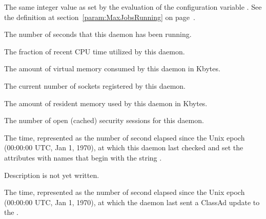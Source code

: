 \begin{description}
\item[\AdAttr{MaxJobsRunning}:] The same integer value as set by the
  evaluation of the configuration variable .
  See the definition at section~\ref{param:MaxJobsRunning} on
  page~\pageref{param:MaxJobsRunning}.

\item[\AdAttr{MonitorSelfAge}:] The number of seconds that this daemon
  has been running.

\item[\AdAttr{MonitorSelfCPUUsage}:] The fraction of recent CPU time utilized
  by this daemon. 

\item[\AdAttr{MonitorSelfImageSize}:] The amount of virtual memory consumed by
  this daemon in Kbytes.

\item[\AdAttr{MonitorSelfRegisteredSocketCount}:] The current number of sockets
  registered by this daemon.

\item[\AdAttr{MonitorSelfResidentSetSize}:] The amount of resident memory
  used by this daemon in Kbytes.

\item[\AdAttr{MonitorSelfSecuritySessions}:] The number of open (cached)
  security sessions for this daemon.

\item[\AdAttr{MonitorSelfTime}:] The  time, represented as the number of
  second elapsed since the Unix epoch (00:00:00 UTC, Jan 1, 1970),
  at which this daemon last checked and set the attributes with names that
  begin with the string .
  
\item[\AdAttr{MyAddress}:] Description is not yet written.

\item[\AdAttr{MyCurrentTime}:]  The time, represented as the number of 
  second elapsed since the Unix epoch (00:00:00 UTC, Jan 1, 1970),
  at which the  daemon last sent a ClassAd update to the
  .


\end{description}
